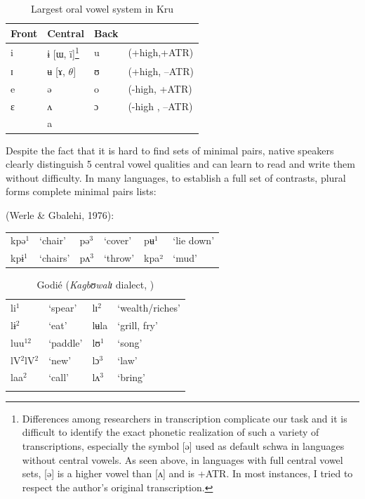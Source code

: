 \documentclass[output=paper
,newtxmath
,modfonts
,nonflat]{langsci/langscibook}
\begin{document}
\begin{table}
\begin{tabular}{llll}

Front  &  Central & Back\\
\midrule
i  &  ɨ [ɯ, ï]\footnote{Differences among researchers in transcription complicate our task and it is difficult to identify the exact phonetic realization of such a variety of transcriptions, especially the symbol [ə] used as default schwa in languages without central vowels. As seen above, in languages with full central vowel sets, [ə] is a higher vowel than [ʌ] and is +ATR. In most instances, I tried to respect the author’s original transcription.} & u  &  (+high,+ATR)\\

ɪ  &  ʉ [ɤ, $\theta $]  & ʊ  &  (+high, –ATR) \\

e  &  ə  &  o  &  (-high, +ATR)\\

ɛ  &  ʌ  &  ɔ  &  (-high , –ATR) \\

& a\\

\end{tabular}	
\caption{Largest oral vowel system in Kru }
\label{tab:zogbo:5}
\end{table}

Despite the fact that it is hard to find  sets of minimal pairs, native speakers clearly distinguish 5 central vowel qualities and can learn to read and write them without difficulty. In many languages, to establish a full set of contrasts, plural forms complete minimal pairs lists: 

\ea {}  (Werle \& Gbalehi, 1976):

\begin{tabular}{llllll}
kpə$^1$ & ‘chair’  &  pə$^3$ &  ‘cover’  &  pʉ$^1$& ‘lie down’\\

kpɨ$^1$ &  ‘chairs’ & pʌ$^3$   & ‘throw’ & kpa²  &  ‘mud’ \\
\end{tabular}
\z

\begin{table}
\begin{tabular}{llll}
\lsptoprule	
li$^1$  &  ‘spear’  &  lɪ$^2$ & ‘wealth/riches’\\

lɨ$^2$  &  ‘eat’  &  lʉla  &  ‘grill, fry’\\

luu$^{12}$ &   ‘paddle’ & lʊ$^1$ & ‘song’\\

lV$^2$lV$^2$ & ‘new’    & lɔ$^3$  &  ‘law’ \\

laa$^2$ & ‘call’ &   lʌ$^3$ &    ‘bring’ \\
\lspbottomrule
\end{tabular}
\caption{Godié (\textit{Kagbʊwalɪ} dialect, \citealt{Association2004})}
\label{tab:zogbo:6}
\end{table}
\end{document}
